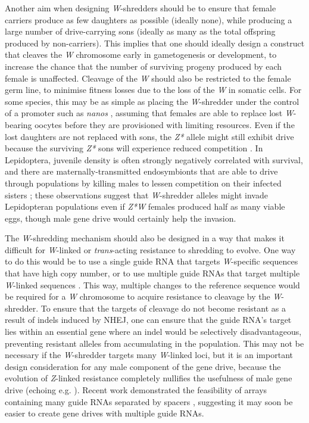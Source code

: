 \documentclass[]{rsos}%
\begin{document}
Another aim when designing \emph{W}-shredders should be to ensure that
female carriers produce as few daughters as possible (ideally none),
while producing a large number of drive-carrying sons (ideally as many
as the total offspring produced by non-carriers). This implies that one
should ideally design a construct that cleaves the \emph{W} chromosome
early in gametogenesis or development, to increase the chance that the
number of surviving progeny produced by each female is unaffected.
Cleavage of the \emph{W} should also be restricted to the female germ
line, to minimise fitness losses due to the loss of the \emph{W} in
somatic cells. For some species, this may be as simple as placing the
\emph{W}-shredder under the control of a promoter such as \emph{nanos}
\citep{champer2018re, zhang2018si}, assuming that females are able to
replace lost \emph{W}-bearing oocytes before they are provisioned with
limiting resources. Even if the lost daughters are not replaced with
sons, the \emph{Z*} allele might still exhibit drive because the
surviving \emph{Z*} sons will experience reduced competition
\citep[somewhat like \emph{Medea};][]{hay2010en}. In Lepidoptera,
juvenile density is often strongly negatively correlated with survival,
and there are maternally-transmitted endosymbionts that are able to
drive through populations by killing males to lessen competition on
their infected sisters \citep[e.g.][]{jiggins2000bu, jiggins2003ma};
these observations suggest that \emph{W}-shredder alleles might invade
Lepidopteran populations even if \emph{Z*W} females produced half as
many viable eggs, though male gene drive would certainly help the
invasion.

The \emph{W}-shredding mechanism should also be designed in a way that
makes it difficult for \emph{W}-linked or \emph{trans}-acting resistance
to shredding to evolve. One way to do this would be to use a single
guide RNA that targets \emph{W}-specific sequences that have high copy
number, or to use multiple guide RNAs that target multiple
\emph{W}-linked sequences \citep{champer2018re}. This way, multiple
changes to the reference sequence would be required for a \emph{W}
chromosome to acquire resistance to cleavage by the \emph{W}-shredder.
To ensure that the targets of cleavage do not become resistant as a
result of indels induced by NHEJ, one can ensure that the guide RNA's
target lies within an essential gene where an indel would be selectively
disadvantageous, preventing resistant alleles from accumulating in the
population. This may not be necessary if the \emph{W}-shredder targets
many \emph{W}-linked loci, but it is an important design consideration
for any male component of the gene drive, because the evolution of
\emph{Z}-linked resistance completely nullifies the usefulness of male
gene drive (echoing e.g. \citep{unckless2017ev}). Recent work
demonstrated the feasibility of arrays containing many guide RNAs
separated by spacers \citep{kurata2018hi}, suggesting it may soon be
easier to create gene drives with multiple guide RNAs.
\end{document}
